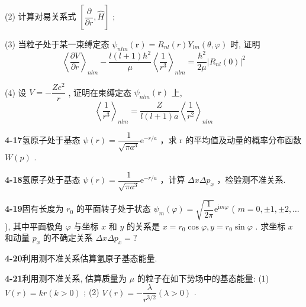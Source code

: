(2) 计算对易关系式 $\displaystyle \left[\dfrac{\partial}{\partial r}, \hat{H}\right]$ ;

(3) 当粒子处于某一束缚定态 $\displaystyle \psi_{nlm}(\boldsymbol{r}) = R_{nl}(r)Y_{lm}(\theta, \varphi)$ 时, 证明
\begin{equation}\tag{4}
\left\langle \dfrac {\partial V}{\partial r} \right\rangle_ {n l m} - \dfrac {l (l + 1) \hbar^ {2}}{\mu} \left\langle \dfrac {1}{r ^ {3}} \right\rangle_ {n l m} = \dfrac {\hbar^ {2}}{2 \mu} \left| R _ {n l} (0) \right| ^ {2}
\end{equation}

(4) 设 $\displaystyle V = -\dfrac{Ze^2}{r}$ , 证明在束缚定态 $\displaystyle \psi_{nlm}(\pmb{r})$ 上,
\begin{equation}\tag{5}
\left\langle \dfrac {1}{r ^ {3}} \right\rangle_ {n l m} = \dfrac {Z}{l (l + 1) a} \left\langle \dfrac {1}{r ^ {2}} \right\rangle_ {n l m}
\end{equation}

\vfill

\newpage

\textbf{4-17}\quad 氢原子处于基态 $\displaystyle \psi(r)=\dfrac{1}{\sqrt{\pi a^{3}}}\mathrm{e}^{-r/a}$ ，求 r 的平均值及动量的概率分布函数 $\displaystyle W(p)$ .

\vfill

\newpage

\textbf{4-18}\quad 氢原子处于基态 $\displaystyle \psi(r)=\dfrac{1}{\sqrt{\pi a^{3}}}\mathrm{e}^{-r/a}$ ，计算 $\displaystyle \Delta x\Delta p_{x}$ ，检验测不准关系.

\vfill

\newpage

\textbf{4-19}\quad 固有长度为 $\displaystyle r_0$ 的平面转子处于状态 $\displaystyle \psi_m(\varphi) = \sqrt{\dfrac{1}{2\pi}}\mathrm{e}^{\mathrm{i}m\varphi}$ ( $\displaystyle m = 0, \pm 1, \pm 2, \dots$ ), 其中平面极角 $\displaystyle \varphi$ 与坐标 $\displaystyle x$ 和 $\displaystyle y$ 的关系是 $\displaystyle x = r_0\cos \varphi, y = r_0\sin \varphi$ . 求坐标 $\displaystyle x$ 和动量 $\displaystyle p_x$ 的不确定关系 $\displaystyle \Delta x\Delta p_x = ?$

\vfill

\newpage

\textbf{4-20}\quad 利用测不准关系估算氢原子基态能量.

\vfill

\newpage

\textbf{4-21}\quad 利用测不准关系, 估算质量为 $\displaystyle \mu$ 的粒子在如下势场中的基态能量: (1) $\displaystyle V(r) = kr(k > 0)$ ; (2) $\displaystyle V(r) = -\dfrac{\lambda}{r^{3/2}} (\lambda > 0)$ .

